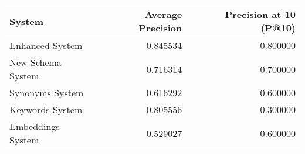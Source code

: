 \begin{tabular}{lrr}
\toprule
System & Average Precision & Precision at 10 (P@10) \\
\midrule
Enhanced System & 0.845534 & 0.800000 \\
New Schema System & 0.716314 & 0.700000 \\
Synonyms System & 0.616292 & 0.600000 \\
Keywords System & 0.805556 & 0.300000 \\
Embeddings System & 0.529027 & 0.600000 \\
\bottomrule
\end{tabular}
